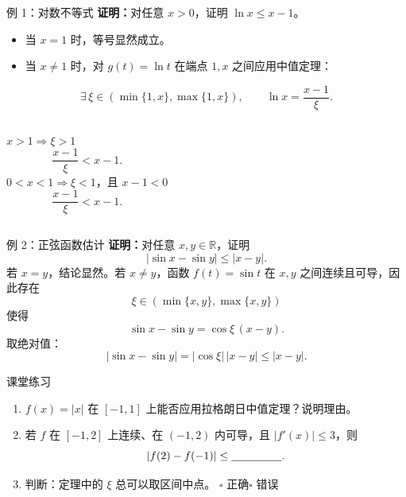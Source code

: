 \documentclass[aspectratio=169,11pt]{beamer}
\begin{document}
\begin{frame}{例 1：对数不等式}
  \textbf{证明：}对任意 $x>0$，证明 $\ln x\le x-1$。
  \vspace{0mm}
  \begin{itemize}
    \item 当 $x=1$ 时，等号显然成立。
    \item 当 $x\ne1$ 时，对 $g(t)=\ln t$ 在端点 $1,x$ 之间应用中值定理：
  \end{itemize}
  \[
    \exists\,\xi\in(\min\{1,x\},\max\{1,x\}),\qquad
    \ln x=\frac{x-1}{\xi}.
  \]
  \begin{columns}[T,onlytextwidth]
      \centering
      $x>1\Rightarrow \xi>1$
      \[
        \frac{x-1}{\xi}<x-1.
      \]
      \centering
      $0<x<1\Rightarrow \xi<1$，且 $x-1<0$
      \[
        \frac{x-1}{\xi}<x-1.
      \]
  \end{columns}
  \vfill
\end{frame}

\begin{frame}{例 2：正弦函数估计}
  \textbf{证明：}对任意 $x,y\in\mathbb{R}$，证明
  \[
    |\sin x-\sin y|\le |x-y|.
  \]
  \vspace{0mm}
  若 $x=y$，结论显然。若 $x\ne y$，函数 $f(t)=\sin t$ 在 $x,y$ 之间连续且可导，因此存在
  \[
    \xi\in(\min\{x,y\},\max\{x,y\})
  \]
  使得
  \[
    \sin x-\sin y=\cos\xi\,(x-y).
  \]
  取绝对值：
  \[
    \boxed{|\sin x-\sin y|=|\cos\xi|\,|x-y|\le |x-y|}.
  \]
  \vfill
\end{frame}

\begin{frame}{课堂练习}
  \begin{enumerate}
    \item $f(x)=|x|$ 在 $[-1,1]$ 上能否应用拉格朗日中值定理？说明理由。
    \vspace{4mm}
    \item 若 $f$ 在 $[-1,2]$ 上连续、在 $(-1,2)$ 内可导，且 $|f'(x)|\le3$，则
      \[
        |f(2)-f(-1)|\le\underline{\hspace{16mm}}.
      \]
    \vspace{3mm}
    \item 判断：定理中的 $\xi$ 总可以取区间中点。\hspace{4mm}
      $\square$ 正确\qquad$\square$ 错误
  \end{enumerate}
  \vfill
\end{frame}
\end{document}
